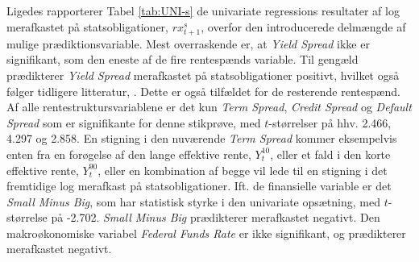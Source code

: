 \documentclass[
  a4paper,
  oneside]{memoir}
\begin{document}
Ligedes rapporterer Tabel \ref{tab:UNI-s} de univariate regressions resultater af log merafkastet på statsobligationer, \(rx_{t+1}^s\), overfor den introducerede delmængde af mulige prædiktionsvariable. Mest overraskende er, at \emph{Yield Spread} ikke er signifikant, som den eneste af de fire rentespænds variable. Til gengæld prædikterer \emph{Yield Spread} merafkastet på statsobligationer positivt, hvilket også følger tidligere litteratur, \citep{Fama1987}. Dette er også tilfældet for de resterende rentespænd. Af alle rentestruktursvariablene er det kun \emph{Term Spread}, \emph{Credit Spread} og \emph{Default Spread} som er signifikante for denne stikprøve, med \(t\)-størrelser på hhv. 2.466, 4.297 og 2.858. En stigning i den nuværende \emph{Term Spread} kommer eksempelvis enten fra en forøgelse af den lange effektive rente, \(Y_t^{10}\), eller et fald i den korte effektive rente, \(Y_t^90\), eller en kombination af begge vil lede til en stigning i det fremtidige log merafkast på statsobligationer. Ift. de finansielle variable er det \emph{Small Minus Big}, som har statistisk styrke i den univariate opsætning, med \(t\)-størrelse på -2.702. \emph{Small Minus Big} prædikterer merafkastet negativt. Den makroøkonomiske variabel \emph{Federal Funds Rate} er ikke signifikant, og prædikterer merafkastet negativt.
\end{document}
